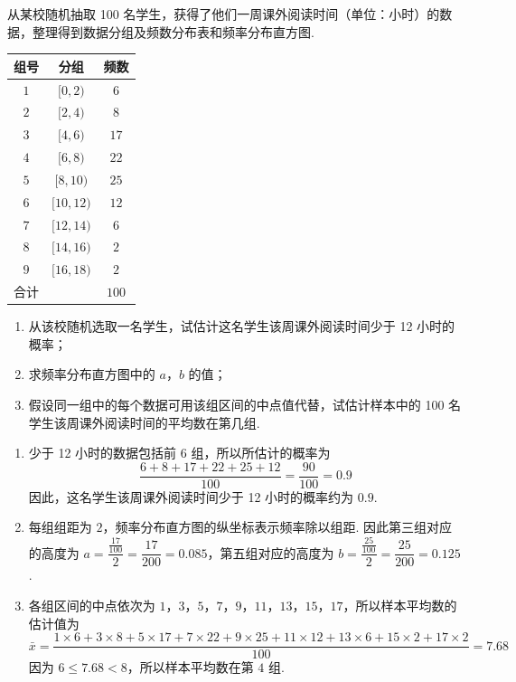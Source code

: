 \begin{problem}
从某校随机抽取 100 名学生，获得了他们一周课外阅读时间（单位：小时）的数据，整理得到数据分组及频数分布表和频率分布直方图.

\begin{center}
\begin{tabular}{c|c|c}
\hline
组号 & 分组 & 频数 \\
\hline
\(1\) & \([0,2)\) & \(6\) \\
\hline
\(2\) & \([2,4)\) & \(8\) \\
\hline
\(3\) & \([4,6)\) & \(17\) \\
\hline
\(4\) & \([6,8)\) & \(22\) \\
\hline
\(5\) & \([8,10)\) & \(25\) \\
\hline
\(6\) & \([10,12)\) & \(12\) \\
\hline
\(7\) & \([12,14)\) & \(6\) \\
\hline
\(8\) & \([14,16)\) & \(2\) \\
\hline
\(9\) & \([16,18)\) & \(2\) \\
\hline
合计 & & \(100\) \\
\hline
\end{tabular}
\end{center}

\begin{enumerate}
\item 从该校随机选取一名学生，试估计这名学生该周课外阅读时间少于 12 小时的概率；
\item 求频率分布直方图中的 \(a\)，\(b\) 的值；
\item 假设同一组中的每个数据可用该组区间的中点值代替，试估计样本中的 100 名学生该周课外阅读时间的平均数在第几组.
\end{enumerate}

\end{problem}

\begin{solution}
\begin{enumerate}
\item 少于 12 小时的数据包括前 6 组，所以所估计的概率为
\[
\frac{6+8+17+22+25+12}{100}=\frac{90}{100}=0.9
\]
因此，这名学生该周课外阅读时间少于 12 小时的概率约为 \(0.9\).

\item 每组组距为 \(2\)，频率分布直方图的纵坐标表示频率除以组距. 因此第三组对应的高度为
\(a=\dfrac{\frac{17}{100}}{2}=\dfrac{17}{200}=0.085\)，第五组对应的高度为
\(b=\dfrac{\frac{25}{100}}{2}=\dfrac{25}{200}=0.125\).

\item 各组区间的中点依次为 \(1\)，\(3\)，\(5\)，\(7\)，\(9\)，\(11\)，\(13\)，\(15\)，\(17\)，所以样本平均数的估计值为
\[
\bar{x}=\frac{1\times6+3\times8+5\times17+7\times22+9\times25+11\times12+13\times6+15\times2+17\times2}{100}=7.68
\]
因为 \(6\leqslant7.68<8\)，所以样本平均数在第 \(4\) 组.
\end{enumerate}
\end{solution}

